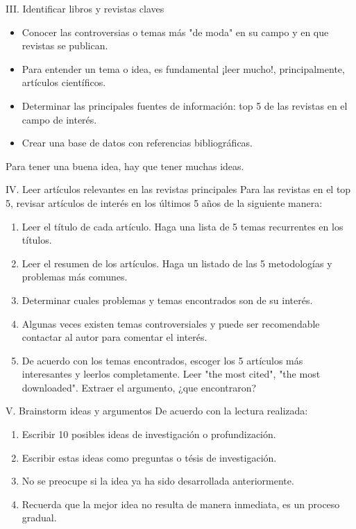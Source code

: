 \documentclass [xcolor=svgnames, t] {beamer}
\begin{document}
\begin{frame}{III. Identificar libros y revistas claves}
\begin{itemize}
\item Conocer las controversias o temas m\'as "de moda" en su campo y en que revistas se publican. 
\item Para entender un tema o idea, es fundamental ¡leer mucho!, principalmente, art\'iculos cient\'ificos.
\item Determinar las principales fuentes de informaci\'on: top 5 de las revistas en el campo de inter\'es.
\item Crear una base de datos con referencias bibliogr\'aficas. 
\end{itemize}
\centering
\alert{Para tener una buena idea, hay que tener muchas ideas.}
\end{frame}

\begin{frame}{IV. Leer art\'iculos relevantes en las revistas principales}
Para las revistas en el top 5, revisar art\'iculos de  inter\'es en los \'ultimos 5 a\~nos de la siguiente manera:
\begin{enumerate}
\item Leer el t\'itulo de cada art\'iculo. Haga una lista de 5 temas recurrentes en los t\'itulos.
\item Leer el resumen de los art\'iculos. Haga un listado de las 5 metodolog\'ias y problemas m\'as comunes. 
\item Determinar cuales problemas y temas encontrados son de su inter\'es.
\item Algunas veces existen temas controversiales y puede ser recomendable contactar al autor para comentar el inter\'es. 
\item De acuerdo con los temas encontrados, escoger los 5 art\'iculos m\'as interesantes y leerlos completamente. Leer "the most cited", "the most downloaded". Extraer el argumento, ¿que encontraron?
\end{enumerate}
\end{frame}


\begin{frame}{V. Brainstorm ideas y argumentos}
De acuerdo con la lectura realizada:
\begin{enumerate}
\item Escribir 10 posibles ideas de investigaci\'on o profundizaci\'on.
\item Escribir estas ideas como preguntas o t\'esis de investigaci\'on.
\item No se preocupe si la idea ya ha sido desarrollada anteriormente.
\item Recuerda que la mejor idea no resulta de manera inmediata, es un proceso gradual.
\end{enumerate}
\end{frame}
\end{document}
